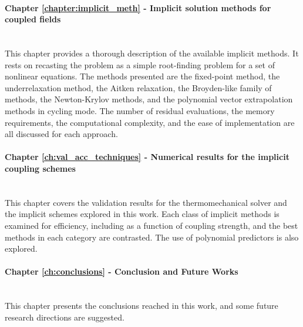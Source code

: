 \paragraph{Chapter \ref{chapter:implicit_meth} - Implicit solution methods for coupled fields}\mbox{}\\
This chapter provides a thorough description of the available implicit methods.
It rests on recasting the problem as a simple root-finding problem for a set of nonlinear equations.
The methods presented are the fixed-point method, the underrelaxation method, the Aitken relaxation, the Broyden-like family of methods, the Newton-Krylov methods, and the polynomial vector extrapolation methods in cycling mode.
The number of residual evaluations, the memory requirements, the computational complexity, and the ease of implementation are all discussed for each approach.

\paragraph{Chapter \ref{ch:val_acc_techniques} - Numerical results for the implicit coupling schemes}\mbox{} \\
This chapter covers the validation results for the thermomechanical solver and the implicit schemes explored in this work.
Each class of implicit methods is examined for efficiency, including as a function of coupling strength, and the best methods in each category are contrasted.
The use of polynomial predictors is also explored.

\paragraph{Chapter \ref{ch:conclusions} - Conclusion and Future Works}\mbox{} \\
This chapter presents the conclusions reached in this work, and some future research directions are suggested.

\newpage\null\thispagestyle{blank}\newpage
